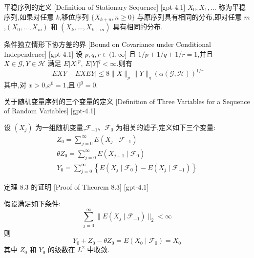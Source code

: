\documentclass[UTF8]{ctexart}
\begin{document}
    
    
    \begin{dfn}
        {平稳序列的定义}
        [Definition of Stationary Sequence]
        [gpt-4.1]
        $X _ { 0 } , X _ { 1 } , \ldots$ 称为平稳序列,如果对任意 $k$,移位序列 $\{ X _ { k + n } , n \geq 0 \}$ 与原序列具有相同的分布,即对任意 $m$,$( X _ { 0 } , \ldots , X _ { m } )$ 和 $( X _ { k } , \ldots , X _ { k + m } )$ 具有相同的分布.
    \end{dfn}
    
    
    
    \begin{lma}
        {条件独立情形下协方差的界}
        [Bound on Covariance under Conditional Independence]
        [gpt-4.1]
        设 $p, q, r \in (1, \infty]$ 且 $1/p + 1/q + 1/r = 1$,并且 $X \in \mathcal{G}, Y \in \mathcal{H}$ 满足 $E|X|^{p},\ E|Y|^{q} < \infty$.则有
\[
| E X Y - E X E Y | \leq 8 \| X \|_{p} \| Y \|_{q} ( \alpha ( \mathcal{G}, \mathcal{H} ) )^{1/r}
\]
其中,对 $x > 0$,$x^{0} = 1$,且 $0^{0} = 0$.
    \end{lma}
    
    
    
    \begin{dfn}
        {关于随机变量序列的三个变量的定义}
        [Definition of Three Variables for a Sequence of Random Variables]
        [gpt-4.1]
        
设 $(X_j)$ 为一组随机变量,$\mathcal{F}_{-1}$、$\mathcal{F}_0$ 为相关的滤子,定义如下三个变量:
\[
\begin{array}{l}
{\displaystyle Z_0 = \sum_{j=0}^\infty E(X_j \mid \mathcal{F}_{-1})} \\[2ex]
{\displaystyle \theta Z_0 = \sum_{j=0}^\infty E(X_{j+1} \mid \mathcal{F}_0)} \\[2ex]
{\displaystyle Y_0 = \sum_{j=0}^\infty \left\{ E(X_j \mid \mathcal{F}_0) - E(X_j \mid \mathcal{F}_{-1}) \right\} }
\end{array}
\]

    \end{dfn}
    
    
    
    \begin{thm}
        {定理 8.3 的证明}
        [Proof of Theorem 8.3]
        [gpt-4.1]
        
假设满足如下条件:
\[
\sum_{j=0}^\infty \| E(X_j \mid \mathcal{F}_{-1}) \|_2 < \infty
\]
则
\[
Y_0 + Z_0 - \theta Z_0 = E(X_0 \mid \mathcal{F}_0) = X_0
\]
其中 $Z_0$ 和 $Y_0$ 的级数在 $L^2$ 中收敛.

    \end{thm}
    
\end{document}
